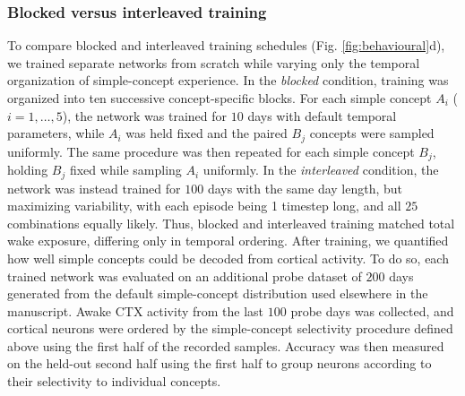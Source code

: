 \documentclass{article}
\begin{document}
\subsubsection*{Blocked versus interleaved training}
To compare blocked and interleaved training schedules (Fig. \ref{fig:behavioural}d), we trained separate networks from scratch while varying only the temporal organization of simple-concept experience. In the \textit{blocked} condition, training was organized into ten successive concept-specific blocks. For each simple concept \(A_i\) (\(i=1,\dots,5\)), the network was trained for \(10\) days with default temporal parameters, while \(A_i\) was held fixed and the paired \(B_j\) concepts were sampled uniformly. The same procedure was then repeated for each simple concept \(B_j\), holding \(B_j\) fixed while sampling \(A_i\) uniformly. In the \textit{interleaved} condition, the network was instead trained for \(100\) days with the same day length, but maximizing variability, with each episode being 1 timestep long, and all \(25\) combinations equally likely. Thus, blocked and interleaved training matched total wake exposure, differing only in temporal ordering.
\newline\newline
After training, we quantified how well simple concepts could be decoded from cortical activity. To do so, each trained network was evaluated on an additional probe dataset of \(200\) days generated from the default simple-concept distribution used elsewhere in the manuscript. Awake CTX activity from the last \(100\) probe days was collected, and cortical neurons were ordered by the simple-concept selectivity procedure defined above using the first half of the recorded samples. Accuracy was then measured on the held-out second half using the first half to group neurons according to their selectivity to individual concepts.
\end{document}
